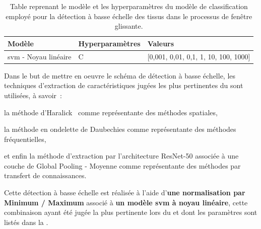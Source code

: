 \begin{table}[H]
    \centering
    \begin{tabular}{lll}
        \toprule
        \textbf{Modèle}                                 & \textbf{Hyperparamètres}  & \textbf{Valeurs}                          \\ \midrule
        \gls{svm} - Noyau linéaire                      & C                         & [0,001, 0,01, 0,1, 1, 10, 100, 1000]      \\ 
        \bottomrule 
    \end{tabular} 
    \caption{Table reprenant le modèle et les hyperparamètres du modèle de classification employé pour la détection à basse échelle des tissus dans le processus de fenêtre glissante.}
    \label{tab:parameters_image_improvement_sliding_window_models}
\end{table}\par

Dans le but de mettre en oeuvre le schéma de détection à basse échelle, les techniques d'extraction de caractéristiques jugées les plus pertinentes du  sont utilisées, à savoir~:~
\begin{inlinerate}
    \item la méthode d'Haralick~ comme représentante des méthodes spatiales,
    \item la méthode en ondelette de Daubechies comme représentante des méthodes fréquentielles,
    \item et enfin la méthode d'extraction par l'architecture ResNet-50 associée à une couche de Global Pooling - Moyenne comme représentante des méthodes par transfert de connaissances.
\end{inlinerate} Cette détection à basse échelle est réalisée à l'aide d'\textbf{une normalisation par Minimum / Maximum} associé à \textbf{un modèle \gls{svm} à noyau linéaire}, cette combinaison ayant été jugée la plus pertinente lors du  et dont les paramètres sont listés dans la .\par

